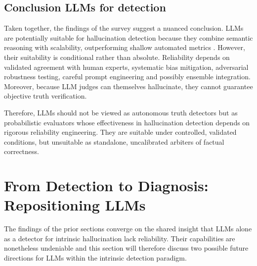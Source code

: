 \documentclass[
  seminar,   	 
  english,   	 
  titlepage=on,
  captions=tableheadings
]{ttlab-qualify}
\begin{document}
\subsection{Conclusion LLMs for detection}
Taken together, the findings of the survey suggest a nuanced conclusion. LLMs are potentially suitable for hallucination detection because they combine semantic reasoning with scalability, outperforming shallow automated metrics . However, their suitability is conditional rather than absolute. Reliability depends on validated agreement with human experts, systematic bias mitigation, adversarial robustness testing, careful prompt engineering and possibly ensemble integration. Moreover, because LLM judges can themselves hallucinate, they cannot guarantee objective truth verification.

Therefore, LLMs should not be viewed as autonomous truth detectors but as probabilistic evaluators whose effectiveness in hallucination detection depends on rigorous reliability engineering. They are suitable under controlled, validated conditions, but unsuitable as standalone, uncalibrated arbiters of factual correctness.

\section{From Detection to Diagnosis: Repositioning LLMs}
\label{sec:diagnosis}
The findings of the prior sections converge on the shared insight that LLMs alone as a detector for intrinsic hallucination lack reliability. Their capabilities are nonetheless undeniable and this section will therefore discuss two possible future directions for LLMs within the intrinsic detection paradigm.
\end{document}
